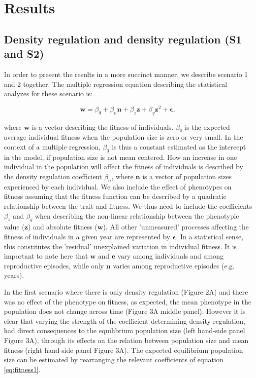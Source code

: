 \documentclass{article}
\begin{document}
\section{Results}

\subsection{Density regulation and density regulation (S1 and S2)}

In order to present the results in a more succinct manner, we describe scenario 1 and 2 together. The multiple regression equation describing the statistical analyzes for these scenario is:

\begin{equation} \label{eq:fitness1}
\mathbf{w}=\beta_{0} +\beta_{n} \mathbf{n} + \beta_{z} \mathbf{z} + \beta_{q} \mathbf{z}^2 + \mathbf{\epsilon},
\end{equation}

\noindent where $\mathbf{w}$ is a vector describing the fitness of individuals. $\beta_{0}$ is the expected average individual fitness when the population size is zero or very small. In the context of a multiple regression, $\beta_{0}$ is thus a constant estimated as the intercept in the model, if population size is not mean centered. How an increase in one individual in the population will affect the fitness of individuals is described by the density regulation coefficient $\beta_{n}$, where $\mathbf{n}$ is a vector of population sizes experienced by each individual. We also include the effect of phenotypes on fitness assuming that the fitness function can be described by a quadratic relationship between the trait and fitness. We thus need to include the coefficients $\beta_{z}$ and $\beta_{q}$ when describing the non-linear relationship between the phenotypic value ($\mathbf{z}$) and absolute fitness ($\mathbf{w}$). All other 'unmeasured' processes affecting the fitness of individuals in a given year are represented by $ \mathbf{\epsilon}$. In a statistical sense, this constitutes the 'residual' unexplained variation in individual fitness. It is important to note here that $\mathbf{w}$ and $\mathbf{e}$ vary among individuals and among reproductive episodes, while only $\mathbf{n}$ varies among reproductive episodes (e.g. years).

In the first scenario where there is only density regulation (Figure 2A) and there was no effect of the phenotype on fitness, as expected, the mean phenotype in the population does not change across time (Figure 3A middle panel). However it is clear that varying the strength of the coefficient determining density regulation, had direct consequences to the equilibrium population size (left hand-side panel Figure 3A), through its effects on the relation between population size and mean fitness (right hand-side panel Figure 3A). The expected equilibrium population size can be estimated by rearranging the relevant coefficients of equation \ref{eq:fitness1}.
\end{document}
